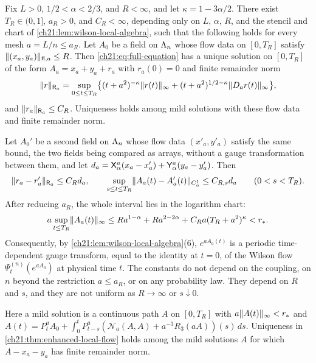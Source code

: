 \begin{theorem}\label{ch21:thm:enhanced-local-flow}
Fix $L>0$, $1/2<\alpha<2/3$, and $R<\infty$, and let $\kappa=1-3\alpha/2$. There exist $T_R\in(0,1]$, $a_R>0$, and $C_R<\infty$, depending only on $L$, $\alpha$, $R$, and the stencil and chart of \cref{ch21:lem:wilson-local-algebra}, such that the following holds for every mesh $a=L/n\le a_R$. Let $A_0$ be a field on $\Lambda_{n}$ whose flow data on $[0,T_R]$ satisfy $\lVert (x_a,y_a)\rVert_{\mathrm{fl},a}\le R$. Then \eqref{ch21:eq:full-equation} has a unique solution on $[0,T_R]$ of the form $A_a=x_a+y_a+r_a$ with $r_a(0)=0$ and finite remainder norm
\begin{equation}\label{ch21:eq:remainder-norm}
 \lVert r\rVert_{\mathsf R_a}=\sup_{0\le t\le T_R}\bigl\{(t+a^2)^{-\kappa}\lVert r(t)\rVert_\infty+(t+a^2)^{1/2-\kappa}\lVert D_ar(t)\rVert_\infty\bigr\},
\end{equation}
and $\lVert r_a\rVert_{\mathsf R_a}\le C_R$. Uniqueness holds among mild solutions with these flow data and finite remainder norm.

Let $A_0'$ be a second field on $\Lambda_{n}$ whose flow data $(x'_a,y'_a)$ satisfy the same bound, the two fields being compared as arrays, without a gauge transformation between them, and let $d_a=\mathsf X_{\alpha}^{a}(x_a-x'_a)+\mathsf Y_{\alpha}^{a}(y_a-y'_a)$. Then
\[
 \lVert r_a-r'_a\rVert_{\mathsf R_a}\le C_Rd_a,\qquad
 \sup_{s\le t\le T_R}\lVert A_a(t)-A'_a(t)\rVert_{C_a^1}\le C_{R,s}d_a\qquad(0<s<T_R).
\]
After reducing $a_R$, the whole interval lies in the logarithm chart:
\[
 a\sup_{t\le T_R}\lVert A_a(t)\rVert_\infty\le Ra^{1-\alpha}+Ra^{2-2\alpha}+C_Ra(T_R+a^2)^\kappa<r_* .
\]
Consequently, by \cref{ch21:lem:wilson-local-algebra}(6), $e^{aA_a(t)}$ is a periodic time-dependent gauge transform, equal to the identity at $t=0$, of the Wilson flow $\Psi^{(n)}_t(e^{aA_0})$ at physical time $t$. The constants do not depend on the coupling, on $n$ beyond the restriction $a\le a_R$, or on any probability law. They depend on $R$ and $s$, and they are not uniform as $R\to\infty$ or $s\downarrow0$.
\end{theorem}

Here a mild solution is a continuous path $A$ on $[0,T_R]$ with $a\lVert A(t)\rVert_\infty<r_*$ and $A(t)=P^a_tA_0+\int_0^tP^a_{t-s}(\mathcal N_a(A,A)+a^{-3}R_3(aA))(s)\,ds$. Uniqueness in \cref{ch21:thm:enhanced-local-flow} holds among the mild solutions $A$ for which $A-x_a-y_a$ has finite remainder norm.

